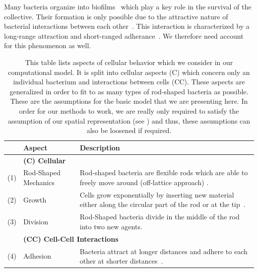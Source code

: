 Many bacteria organize into biofilms~\cite{Dunne2002,Ong1999} which play a key role in the survival
of the collective.
Their formation is only possible due to the attractive nature of bacterial interactions between
each other~\cite{Berne2018}.
This interaction is characterized by a long-range attraction and short-ranged
adherance~\cite{Verwey1947,Trejo2013}.
We therefore need account for this phenomenon as well.

\begin{table}[H]
    \centering
    \def\arraystretch{1.3}
    \begin{tabularx}{\textwidth}{c l X}
        &\textbf{Aspect} & \textbf{Description}\\
        \toprule
        &\multicolumn{2}{l}{\textbf{(C) Cellular}}\\
        \midrule
        (1) & Rod-Shaped Mechanics &
        Rod-shaped bacteria are flexible rods which are able to freely move around (off-lattice
        approach) \cite{Takeuchi2005,Ursell2014,Amir2014_2}.\\
        (2) & Growth &
        Cells grow exponentially by inserting new material either along the circular part of the
        rod or at the tip~\cite{Robert2014,Takeuchi2005}.\\
        (3) & Division &
        Rod-Shaped bacteria divide in the middle of the rod into two new agents.\\
        &\multicolumn{2}{l}{\textbf{(CC) Cell-Cell Interactions}}\\
        \midrule
        (4) & Adhesion &
        Bacteria attract at longer distances and adhere to each other at shorter
        distances~\cite{Verwey1947,Trejo2013}.\\
        \bottomrule
    \end{tabularx}
    \caption{
        This table lists aspects of cellular behavior which we consider in our computational model.
        It is split into cellular aspects (C) which concern only an individual bacterium and
        interactions between cells (CC).
        These aspects are generalized in order to fit to as many types of rod-shaped bacteria as
        possible.
        These are the assumptions for the basic model that we are presenting here.
        In order for our methods to work, we are really only required to satisfy the assumption of
        our spatial representation (see ) and thus, these
        assumptions can also be loosened if required.
    }
    \label{table:simulation-aspects}
\end{table}

